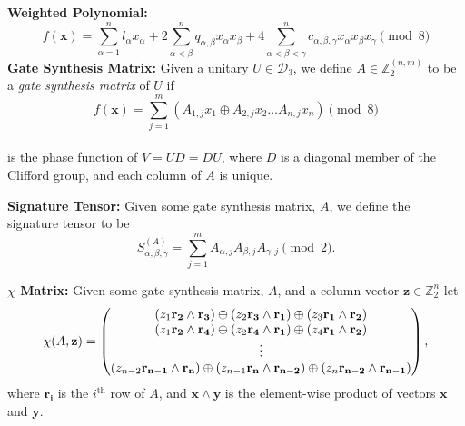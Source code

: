 \documentclass[a0,landscape]{a0poster}
\begin{document}
\begin{multicols}{3}
\begin{minipage}[b]{\linewidth}
\begin{tcolorbox}[title=\textcolor{white}{\huge\textbf{\textsf{Diagonal CNOT + T Framework}\textcolor{black}{y}}}]
\begin{tcolorbox}
				\textbf{Weighted Polynomial:}
				\begin{equation*}
				f(\mathbf{x}) = \sum_{\alpha=1}^{n}l_{\alpha}x_{\alpha} + 2\sum_{\alpha<\beta}^{n}q_{\alpha,\beta}x_{\alpha}x_{\beta} + 4\sum_{\alpha<\beta<\gamma}^{n} c_{\alpha,\beta,\gamma}x_{\alpha}x_{\beta}x_{\gamma} \pmod{8}
				\end{equation*}\fi
				\textbf{Gate Synthesis Matrix:}
				Given a unitary $U\in \mathcal{D}_3$, we define $A\in\mathbb{Z}_2^{(n,m)}$ to be a \emph{gate synthesis matrix} of $U$ if
				\begin{equation*}
				f(\mathbf{x}) = \sum_{j=1}^{m}(A_{1,j}x_1 \oplus A_{2,j}x_2 \dots A_{n,j} x_n) \pmod{8}
				\end{equation*}\\
				is the phase function of $V = UD = DU$, where $D$ is a diagonal member of the Clifford group, and each column of $A$ is unique.
				
				\vspace{0.5cm}
				
				\textbf{Signature Tensor:} Given some gate synthesis matrix, $A$, we define the signature tensor to be 
				\begin{equation*}
				S_{\alpha,\beta,\gamma}^{(A)} = \sum_{j=1}^{m}A_{\alpha,j}A_{\beta,j}A_{\gamma,j} \pmod{2}.
				\end{equation*}
				
				\vspace{0.5cm}
				
				\textbf{$\chi$ Matrix:} Given some gate synthesis matrix, $A$, and a column vector $\mathbf{z}\in\mathbb{Z}_2^n$ let					
				\begin{equation*}
				\chi(A,\mathbf{z}) = \normalsize\begin{pmatrix}
				(z_1\mathbf{r_2}\wedge\mathbf{r_3})\oplus (z_2\mathbf{r_3}\wedge\mathbf{r_1})\oplus (z_3\mathbf{r_1}\wedge\mathbf{r_2})\\
				(z_1\mathbf{r_2}\wedge\mathbf{r_4})\oplus (z_2\mathbf{r_4}\wedge\mathbf{r_1})\oplus (z_4\mathbf{r_1}\wedge\mathbf{r_2})\\
				\vdots \\
				(z_{n-2}\mathbf{r_{n-1}}\wedge\mathbf{r_{n}})\oplus (z_{n-1}\mathbf{r_{n}}\wedge\mathbf{r_{n-2}})\oplus (z_{n}\mathbf{r_{n-2}}\wedge\mathbf{r_{n-1}})\\
				\end{pmatrix}\large,
				\end{equation*}
				where $\mathbf{r_i}$ is the $i^{\text{th}}$ row of $A$, and $\mathbf{x}\wedge\mathbf{y}$ is the element-wise product of vectors $\mathbf{x}$ and $\mathbf{y}$.
			\end{tcolorbox}
					

\end{tcolorbox}
\end{minipage}
\end{multicols}
\end{document}
